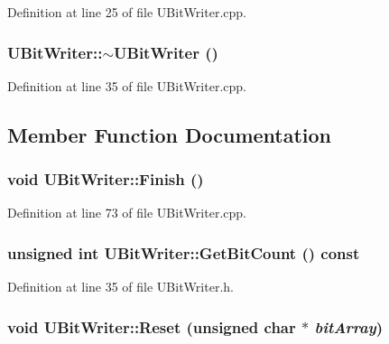 Definition at line 25 of file UBitWriter.cpp.\hypertarget{class_u_bit_writer_beaa31d5b432d83452d4515d81e6e17f}{
\subsubsection[{$\sim$UBitWriter}]{\setlength{\rightskip}{0pt plus 5cm}UBitWriter::$\sim$UBitWriter ()}}
\label{class_u_bit_writer_beaa31d5b432d83452d4515d81e6e17f}




Definition at line 35 of file UBitWriter.cpp.

\subsection{Member Function Documentation}
\hypertarget{class_u_bit_writer_e5a5a7cd5aaf0f4a9b91331d94825a33}{
\subsubsection[{Finish}]{\setlength{\rightskip}{0pt plus 5cm}void UBitWriter::Finish ()}}
\label{class_u_bit_writer_e5a5a7cd5aaf0f4a9b91331d94825a33}




Definition at line 73 of file UBitWriter.cpp.\hypertarget{class_u_bit_writer_f6f57344e33cbb035fab173f200d2f66}{
\subsubsection[{GetBitCount}]{\setlength{\rightskip}{0pt plus 5cm}unsigned int UBitWriter::GetBitCount () const}}
\label{class_u_bit_writer_f6f57344e33cbb035fab173f200d2f66}




Definition at line 35 of file UBitWriter.h.\hypertarget{class_u_bit_writer_22c488a1b7f27b4e4be45fa9048746fb}{
\subsubsection[{Reset}]{\setlength{\rightskip}{0pt plus 5cm}void UBitWriter::Reset (unsigned char $\ast$ {\em bitArray})}}
\label{class_u_bit_writer_22c488a1b7f27b4e4be45fa9048746fb}




